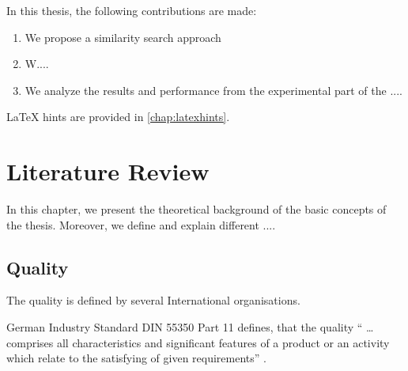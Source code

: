 In this thesis, the following contributions are made:
\begin{enumerate}

\item We propose a similarity search approach 

\item  W....

\item  We analyze the results and performance from the experimental part of the ....

\end{enumerate}











LaTeX hints are provided in \autoref{chap:latexhints}.

\chapter{Literature Review}
In this chapter, we present the theoretical background of the basic concepts of the thesis. Moreover, we define and explain different ....


\section{Quality}
The quality is defined by several International organisations.

German Industry Standard DIN 55350 Part 11 defines, that the quality “ … comprises all characteristics and significant features of a product or an activity which relate to the satisfying of given requirements” \citet{fitzpatrick1996software}.

